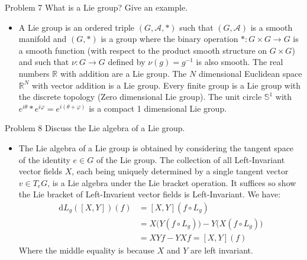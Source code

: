 \documentclass{beamer}
\begin{document}
    \begin{frame}{Problem 7}
        What is a Lie group? Give an example.
        \begin{itemize}
            \item A Lie group is an ordered triple $(G,\mathcal{A},*)$ such
                that $(G,\mathcal{A})$ is a smooth manifold and
                $(G,*)$ is a group where the binary operation
                $*:G\times{G}\rightarrow{G}$ is a smooth function (with respect
                to the product smooth structure on $G\times{G}$) and such that
                $\nu:G\rightarrow{G}$ defined by $\nu(g)=g^{-1}$ is also smooth.
                The real numbers $\mathbb{R}$ with addition are a Lie group.
                The $N$ dimensional Euclidean space $\mathbb{R}^{N}$ with
                vector addition is a Lie group. Every finite group is a Lie
                group with the discrete topology (Zero dimensional Lie group).
                The unit circle $\mathbb{S}^{1}$ with
                $e^{i\theta}*e^{i\varphi}=e^{i(\theta+\varphi)}$ is a compact
                1 dimensional Lie group.
        \end{itemize}
    \end{frame}
    \begin{frame}{Problem 8}
        Discuss the Lie algebra of a Lie group.
        \begin{itemize}
            \item The Lie algebra of a Lie group is obtained by considering the
                tangent space of the identity $e\in{G}$ of the Lie group. The
                collection of all Left-Invariant vector fields $X$, each being
                uniquely determined by a single tangent vector
                $v\in{T}_{e}G$, is a Lie algebra under the Lie bracket
                operation. It suffices so show the Lie bracket of Left-Invarient
                vector fields is Left-Invariant. We have:
                \begin{align}
                    \textrm{d}L_{g}([X,Y])(f)
                        &=[X,Y](f\circ{L}_{g})\\
                        &=X\big(Y(f\circ{L}_{g})\big)-Y\big(X(f\circ{L}_{g})\big)\\
                        &=XYf-YXf=[X,Y](f)
                \end{align}
                Where the middle equality is because $X$ and $Y$ are left
                invariant.
        \end{itemize}
    \end{frame}
\end{document}
